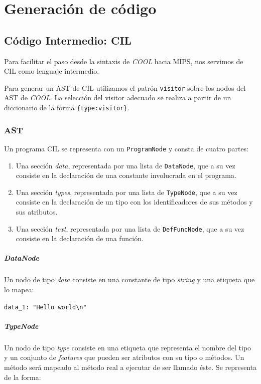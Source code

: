 \documentclass[a4paper,10pt,twocolumn]{article}
\begin{document}
\section{Generación de código}

\subsection{Código Intermedio: CIL}
Para facilitar el paso desde la sintaxis de \textit{COOL} hacia MIPS, nos servimos de CIL como lenguaje intermedio. 

Para generar un AST de CIL utilizamos el patrón \lstinline|visitor| sobre los nodos del AST de \textit{COOL}. La selección del visitor adecuado se realiza a partir de un diccionario de la forma \lstinline|{type:visitor}|.

\subsubsection{AST}

Un programa CIL se representa con un \lstinline|ProgramNode| y consta de cuatro partes:

\begin{enumerate}
	\item Una sección \textit{data}, representada por una lista de \lstinline|DataNode|, que a su vez consiste en la declaración de una constante involucrada en el programa. 
	\item Una sección \textit{types}, representada por una lista de \lstinline|TypeNode|, que a su vez consiste en la declaración de un tipo con los identificadores de sus métodos y sus atributos. 
	\item Una sección \textit{text}, representada por una lista de \lstinline|DefFuncNode|, que a su vez consiste en la declaración de una función.
\end{enumerate}

\subparagraph{DataNode}

Un nodo de tipo \textit{data} consiste en una constante de tipo \textit{string} y una etiqueta que lo mapea:

\begin{center}
	\lstinline|data_1: "Hello world\n"|
\end{center}

\subparagraph{TypeNode}

Un nodo de tipo \textit{type} consiste en una etiqueta que representa el nombre del tipo y un conjunto de \textit{features} que pueden ser atributos con su tipo o métodos. Un método será mapeado al método real a ejecutar de ser llamado éste. Se representa de la forma:
\end{document}
